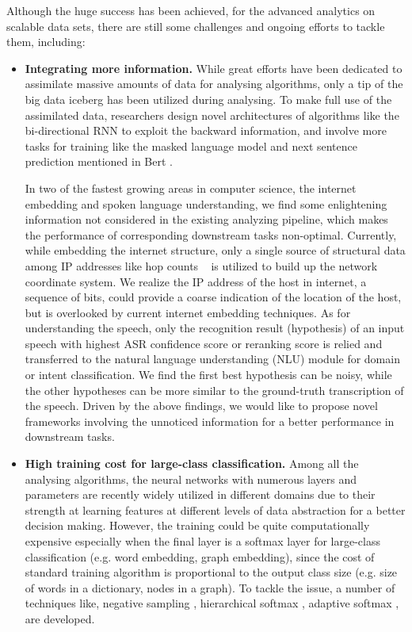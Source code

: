 \documentclass [PhD] {uclathes}
\begin{document}
Although the huge success has been achieved, for the advanced analytics on scalable data sets, there are still some challenges and ongoing efforts to tackle them, including:
\begin{itemize}
	
	\item \textbf{Integrating more information.} While great efforts have been dedicated to assimilate massive amounts of data for analysing algorithms, only a tip of the big data iceberg has been utilized during analysing. 
	To make full use of the assimilated data, researchers design novel architectures of algorithms like the bi-directional RNN \citep{graves2013speech} to exploit the backward information, and involve more tasks for training like the masked language model and next sentence prediction mentioned in Bert \citep{devlin2018bert}.
	
	In two of the fastest growing areas in  computer science, the internet embedding and spoken language understanding, we find some enlightening information not considered in the existing analyzing pipeline, which makes  the performance of corresponding downstream tasks non-optimal. Currently, while embedding the internet structure,  only a single source of structural data among IP addresses like hop counts ~\citep{barford-sigcomm,barford-infocom} is utilized to build up the network coordinate system. We realize the IP address of the host in internet, a sequence of bits, could provide a coarse indication of the location of the host, but is overlooked by current internet embedding techniques. As for understanding the speech, only the recognition result (hypothesis) of an input speech with highest ASR confidence score \citep{tur2011spoken} or reranking score \citep{peng2013search, morbini2012reranking} is relied and transferred to the natural language understanding (NLU) module for domain or intent classification.  We find the first best hypothesis can be noisy, while the other hypotheses can be more similar to the  ground-truth transcription of the speech. Driven by the above findings, we would like to propose novel frameworks involving the unnoticed information for a better performance in downstream tasks. 
	
	\item \textbf{High training cost for large-class classification.} Among all the analysing algorithms, the neural networks with numerous layers and parameters are recently widely utilized  in different domains due to their strength at learning features at different levels of data abstraction for a better decision making. However, the training could be quite computationally expensive especially when the final layer is a softmax layer for large-class classification (e.g. word embedding, graph embedding), since the cost of standard training algorithm  is proportional to the output class size (e.g. size of words in a dictionary, nodes in a graph).  To tackle the issue, a number of techniques like, negative sampling \citep{mikolov2013efficient}, hierarchical  softmax \citep{morin2005hierarchical}, adaptive softmax \citep{bengio2008adaptive,rawat2019sampled} , are developed.
	

\end{itemize}
\end{document}
